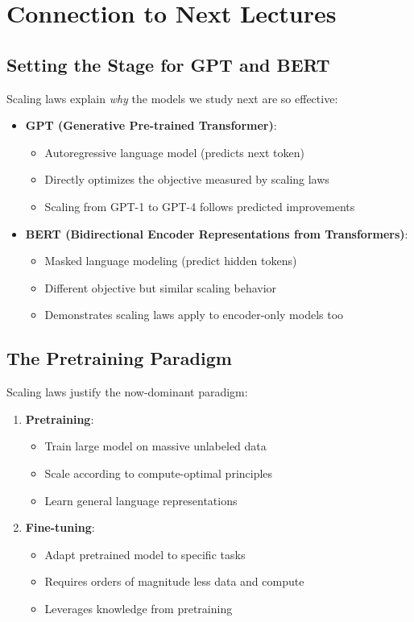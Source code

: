 \documentclass{article}
\begin{document}
\section{Connection to Next Lectures}

\subsection{Setting the Stage for GPT and BERT}

Scaling laws explain \textit{why} the models we study next are so effective:

\begin{itemize}
\item \textbf{GPT (Generative Pre-trained Transformer)}:
\begin{itemize}
\item Autoregressive language model (predicts next token)
\item Directly optimizes the objective measured by scaling laws
\item Scaling from GPT-1 to GPT-4 follows predicted improvements
\end{itemize}

\item \textbf{BERT (Bidirectional Encoder Representations from Transformers)}:
\begin{itemize}
\item Masked language modeling (predict hidden tokens)
\item Different objective but similar scaling behavior
\item Demonstrates scaling laws apply to encoder-only models too
\end{itemize}
\end{itemize}

\subsection{The Pretraining Paradigm}

Scaling laws justify the now-dominant paradigm:

\begin{enumerate}
\item \textbf{Pretraining}:
\begin{itemize}
\item Train large model on massive unlabeled data
\item Scale according to compute-optimal principles
\item Learn general language representations
\end{itemize}

\item \textbf{Fine-tuning}:
\begin{itemize}
\item Adapt pretrained model to specific tasks
\item Requires orders of magnitude less data and compute
\item Leverages knowledge from pretraining
\end{itemize}
\end{enumerate}
\end{document}

